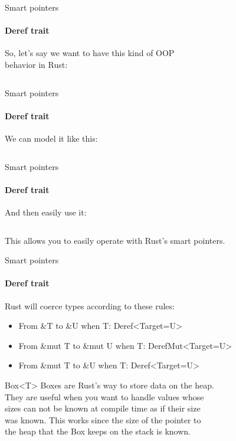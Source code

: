 \documentclass[usenames,dvipsnames,10pt,aspectratio=169]{beamer}
\begin{document}
\begin{frame}{Smart pointers}
	\framesubtitle{Deref trait}
	\large
	So, let's say we want to have this kind of OOP\\
	behavior in Rust:
	\vspace{0.4cm}
	\inputminted[fontsize=\normalsize]{java}{code/deref1.rs}
\end{frame}

\begin{frame}{Smart pointers}
	\framesubtitle{Deref trait}
	\large
	We can model it like this:
	\vspace{0.1cm}
	\inputminted[fontsize=\footnotesize]{rust}{code/deref2.rs}
	\vspace{0.4cm}
\end{frame}

\begin{frame}{Smart pointers}
	\framesubtitle{Deref trait}
	\large
	And then easily use it:
	\vspace{0.4cm}
	\inputminted[fontsize=\large]{rust}{code/deref3.rs}
	\vspace{0.4cm}
	This allows you to easily operate with Rust's smart pointers.
\end{frame}

\begin{frame}{Smart pointers}
	\framesubtitle{Deref trait}
	\large
	Rust will coerce types according to these rules:
	
\begin{itemize}[label=$\bullet$]
	\item From \textcolor{ucuyellow}{\&T} to 
		\textcolor{ucuyellow}{\&U} when 
		\textcolor{ucuyellow}{T: Deref<Target=U>}
	\item From \textcolor{ucuyellow}{\&mut T} to
		\textcolor{ucuyellow}{\&mut U} when 
		\textcolor{ucuyellow}{T: DerefMut<Target=U>}
	\item From \textcolor{ucuyellow}{\&mut T} to
		\textcolor{ucuyellow}{\&U} when
		\textcolor{ucuyellow}{T: Deref<Target=U>}
\end{itemize}
\end{frame}

\begin{frame}{Box<T>}
	\large
	Boxes are Rust's way to store data on the heap.\\
	\vspace{0.4cm}
	They are useful when you want to handle values whose\\
	sizes can not be known at compile time as if their size\\
	was known. This works since the size of the pointer to\\
	the heap that the Box keeps on the stack is known.\\
\end{frame}
\end{document}
